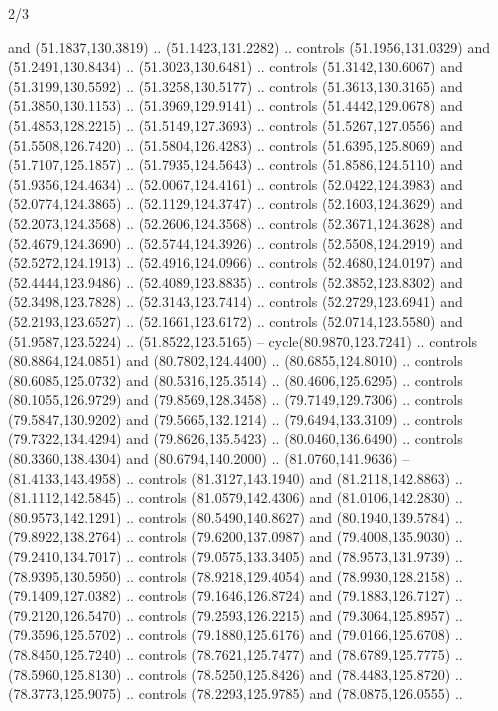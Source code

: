 \begin{flagdescription}{2/3}
\begin{scope}[shift={(0.5\flaglength,0.5)},scale=\flagwidth/320]
\begin{scope}[y=0.8pt, x=0.8pt, yscale=-1,shift={(-118.3,-146)}]
  and (51.1837,130.3819) .. (51.1423,131.2282) .. controls (51.1956,131.0329)
  and (51.2491,130.8434) .. (51.3023,130.6481) .. controls (51.3142,130.6067)
  and (51.3199,130.5592) .. (51.3258,130.5177) .. controls (51.3613,130.3165)
  and (51.3850,130.1153) .. (51.3969,129.9141) .. controls (51.4442,129.0678)
  and (51.4853,128.2215) .. (51.5149,127.3693) .. controls (51.5267,127.0556)
  and (51.5508,126.7420) .. (51.5804,126.4283) .. controls (51.6395,125.8069)
  and (51.7107,125.1857) .. (51.7935,124.5643) .. controls (51.8586,124.5110)
  and (51.9356,124.4634) .. (52.0067,124.4161) .. controls (52.0422,124.3983)
  and (52.0774,124.3865) .. (52.1129,124.3747) .. controls (52.1603,124.3629)
  and (52.2073,124.3568) .. (52.2606,124.3568) .. controls (52.3671,124.3628)
  and (52.4679,124.3690) .. (52.5744,124.3926) .. controls (52.5508,124.2919)
  and (52.5272,124.1913) .. (52.4916,124.0966) .. controls (52.4680,124.0197)
  and (52.4444,123.9486) .. (52.4089,123.8835) .. controls (52.3852,123.8302)
  and (52.3498,123.7828) .. (52.3143,123.7414) .. controls (52.2729,123.6941)
  and (52.2193,123.6527) .. (52.1661,123.6172) .. controls (52.0714,123.5580)
  and (51.9587,123.5224) .. (51.8522,123.5165) -- cycle(80.9870,123.7241) ..
  controls (80.8864,124.0851) and (80.7802,124.4400) .. (80.6855,124.8010) ..
  controls (80.6085,125.0732) and (80.5316,125.3514) .. (80.4606,125.6295) ..
  controls (80.1055,126.9729) and (79.8569,128.3458) .. (79.7149,129.7306) ..
  controls (79.5847,130.9202) and (79.5665,132.1214) .. (79.6494,133.3109) ..
  controls (79.7322,134.4294) and (79.8626,135.5423) .. (80.0460,136.6490) ..
  controls (80.3360,138.4304) and (80.6794,140.2000) .. (81.0760,141.9636) --
  (81.4133,143.4958) .. controls (81.3127,143.1940) and (81.2118,142.8863) ..
  (81.1112,142.5845) .. controls (81.0579,142.4306) and (81.0106,142.2830) ..
  (80.9573,142.1291) .. controls (80.5490,140.8627) and (80.1940,139.5784) ..
  (79.8922,138.2764) .. controls (79.6200,137.0987) and (79.4008,135.9030) ..
  (79.2410,134.7017) .. controls (79.0575,133.3405) and (78.9573,131.9739) ..
  (78.9395,130.5950) .. controls (78.9218,129.4054) and (78.9930,128.2158) ..
  (79.1409,127.0382) .. controls (79.1646,126.8724) and (79.1883,126.7127) ..
  (79.2120,126.5470) .. controls (79.2593,126.2215) and (79.3064,125.8957) ..
  (79.3596,125.5702) .. controls (79.1880,125.6176) and (79.0166,125.6708) ..
  (78.8450,125.7240) .. controls (78.7621,125.7477) and (78.6789,125.7775) ..
  (78.5960,125.8130) .. controls (78.5250,125.8426) and (78.4483,125.8720) ..
  (78.3773,125.9075) .. controls (78.2293,125.9785) and (78.0875,126.0555) ..

\end{scope}
\end{scope}
\end{flagdescription}
